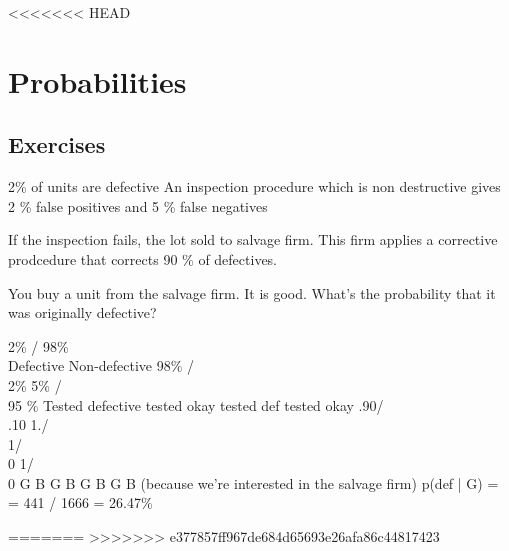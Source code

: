 \documentclass[9pt, letterpaper, oneside]{article}
\begin{document}
<<<<<<< HEAD
\section{Probabilities}
\subsection{Exercises}

2\% of units are defective
An inspection procedure which is non destructive gives 2 \% false positives and 5 \% false negatives

If the inspection fails, the lot sold to salvage firm. This firm applies a corrective prodcedure that corrects 90 \% of defectives.

You buy a unit from the salvage firm. It is good. What's the probability that it was originally defective?

								2\%	/                                   98\%     \\
								  Defective				Non-defective
							98\%	  /             \\ 2\%                         5\% /                  \\ 95 \%
					Tested defective	     tested okay          tested def                     tested okay
					.90/			\\.10		1./	\\		1/	\\0			1/	\\0
					G			B		G	B		G	B			G	B
										(because we're interested in the salvage firm)	
p(def | G) =  = 441 / 1666 = 26.47\%
										
										

=======
>>>>>>> e377857ff967de684d65693e26afa86c44817423
\end{document}
